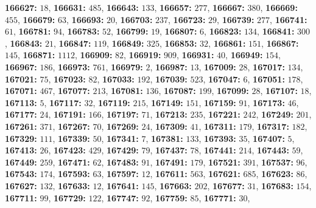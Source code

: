 \textsf{\bfseries 166627:} $18$, \textsf{\bfseries 166631:} $485$, \textsf{\bfseries 166643:} $133$, \textsf{\bfseries 166657:} $277$, \textsf{\bfseries 166667:} $380$, \textsf{\bfseries 166669:} $455$, \textsf{\bfseries 166679:} $63$, \textsf{\bfseries 166693:} $20$, \textsf{\bfseries 166703:} $237$, \textsf{\bfseries 166723:} $29$, \textsf{\bfseries 166739:} $277$, \textsf{\bfseries 166741:} $61$, \textsf{\bfseries 166781:} $94$, \textsf{\bfseries 166783:} $52$, \textsf{\bfseries 166799:} $19$, \textsf{\bfseries 166807:} $6$, \textsf{\bfseries 166823:} $134$, \textsf{\bfseries 166841:} $300$, \textsf{\bfseries 166843:} $21$, \textsf{\bfseries 166847:} $119$, \textsf{\bfseries 166849:} $325$, \textsf{\bfseries 166853:} $32$, \textsf{\bfseries 166861:} $151$, \textsf{\bfseries 166867:} $145$, \textsf{\bfseries 166871:} $1112$, \textsf{\bfseries 166909:} $82$, \textsf{\bfseries 166919:} $909$, \textsf{\bfseries 166931:} $40$, \textsf{\bfseries 166949:} $154$, \textsf{\bfseries 166967:} $186$, \textsf{\bfseries 166973:} $761$, \textsf{\bfseries 166979:} $2$, \textsf{\bfseries 166987:} $13$, \textsf{\bfseries 167009:} $28$, \textsf{\bfseries 167017:} $134$, \textsf{\bfseries 167021:} $75$, \textsf{\bfseries 167023:} $82$, \textsf{\bfseries 167033:} $192$, \textsf{\bfseries 167039:} $523$, \textsf{\bfseries 167047:} $6$, \textsf{\bfseries 167051:} $178$, \textsf{\bfseries 167071:} $467$, \textsf{\bfseries 167077:} $213$, \textsf{\bfseries 167081:} $136$, \textsf{\bfseries 167087:} $199$, \textsf{\bfseries 167099:} $28$, \textsf{\bfseries 167107:} $18$, \textsf{\bfseries 167113:} $5$, \textsf{\bfseries 167117:} $32$, \textsf{\bfseries 167119:} $215$, \textsf{\bfseries 167149:} $151$, \textsf{\bfseries 167159:} $91$, \textsf{\bfseries 167173:} $46$, \textsf{\bfseries 167177:} $24$, \textsf{\bfseries 167191:} $166$, \textsf{\bfseries 167197:} $71$, \textsf{\bfseries 167213:} $235$, \textsf{\bfseries 167221:} $242$, \textsf{\bfseries 167249:} $201$, \textsf{\bfseries 167261:} $371$, \textsf{\bfseries 167267:} $70$, \textsf{\bfseries 167269:} $24$, \textsf{\bfseries 167309:} $41$, \textsf{\bfseries 167311:} $179$, \textsf{\bfseries 167317:} $182$, \textsf{\bfseries 167329:} $111$, \textsf{\bfseries 167339:} $50$, \textsf{\bfseries 167341:} $7$, \textsf{\bfseries 167381:} $133$, \textsf{\bfseries 167393:} $35$, \textsf{\bfseries 167407:} $5$, \textsf{\bfseries 167413:} $26$, \textsf{\bfseries 167423:} $429$, \textsf{\bfseries 167429:} $79$, \textsf{\bfseries 167437:} $78$, \textsf{\bfseries 167441:} $214$, \textsf{\bfseries 167443:} $59$, \textsf{\bfseries 167449:} $259$, \textsf{\bfseries 167471:} $62$, \textsf{\bfseries 167483:} $91$, \textsf{\bfseries 167491:} $179$, \textsf{\bfseries 167521:} $391$, \textsf{\bfseries 167537:} $96$, \textsf{\bfseries 167543:} $174$, \textsf{\bfseries 167593:} $63$, \textsf{\bfseries 167597:} $12$, \textsf{\bfseries 167611:} $563$, \textsf{\bfseries 167621:} $685$, \textsf{\bfseries 167623:} $86$, \textsf{\bfseries 167627:} $132$, \textsf{\bfseries 167633:} $12$, \textsf{\bfseries 167641:} $145$, \textsf{\bfseries 167663:} $202$, \textsf{\bfseries 167677:} $31$, \textsf{\bfseries 167683:} $154$, \textsf{\bfseries 167711:} $99$, \textsf{\bfseries 167729:} $122$, \textsf{\bfseries 167747:} $92$, \textsf{\bfseries 167759:} $85$, \textsf{\bfseries 167771:} $30$, 
